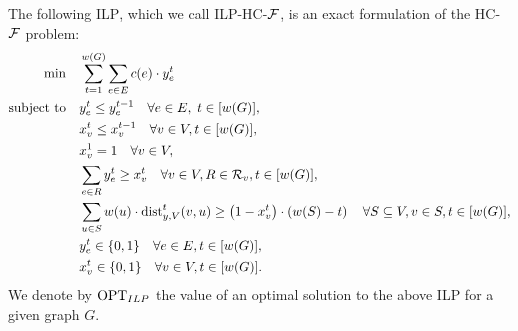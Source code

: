     The following \textsc{ILP}, which we call \textsc{ILP-HC-$\mathcal{F}$}, is an exact formulation of the \textsc{HC-$\mathcal{F}$} problem:
    \begin{align}
        \min \quad &\sum_{t=1}^{w\mathopen{}\left( G \right)} \sum_{e\in E} c(e) \cdot y_{e}^t\\
        \text{subject to} \quad &y_{e}^t \leq y_{e}^{t-1} \quad \forall e\in E,\; t\in [w\mathopen{}\left( G \right)],\\
        &x_v^t \leq x_v^{t-1} \quad \forall v\in V, t\in [w\mathopen{}\left( G \right)],\\
        &x_v^1 = 1 \quad \forall v\in V,\\
        &\sum_{e\in R} y_{e}^t \geq x_{v}^t \quad \forall v\in V, R\in \mathcal{R}_v, t\in [w\mathopen{}\left( G \right)], \label{cover_constraint_ILP}\\
        &\sum_{u\in S} w(u)\cdot \text{dist}_{y, V}^{t}(v,u) \geq \mathopen{}\left( 1-x_v^t \right)\cdot \mathopen{}\left( w\mathopen{}\left( S \right)-t \right) \quad \forall S\subseteq V, v\in S, t\in [w\mathopen{}\left( G \right)], \label{spreading_constraint_ILP}\\
        &y_{e}^t \in \{0,1\} \quad \forall e\in E, t\in [w\mathopen{}\left( G \right)],\\
        &x_v^t \in \{0,1\} \quad \forall v\in V, t\in [w\mathopen{}\left( G \right)].
    \end{align}
    We denote by $\text{OPT}_{ILP}$ the value of an optimal solution to the above ILP for a given graph $G$.

